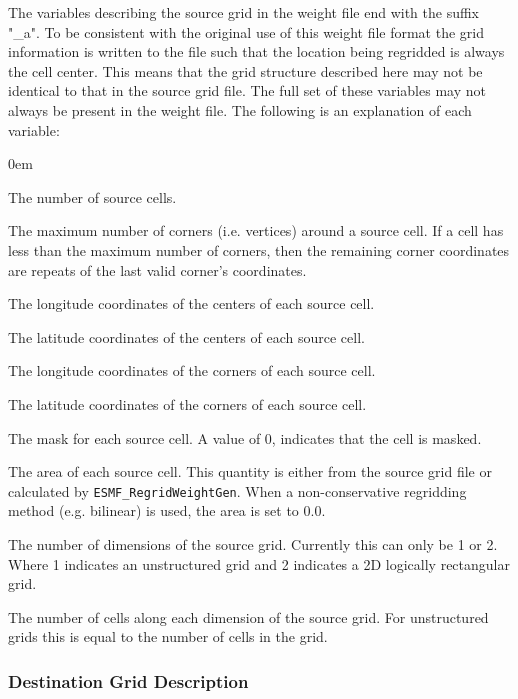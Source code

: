 The variables describing the source grid in the weight file end with the suffix "\_a". To be consistent with the original use of this weight file format 
the grid information is written to the file such that the location being regridded is always the cell center. This means that the grid structure described here may not be identical to that in the source grid file. The full set of these variables may not always be present in the weight file. The following is an 
explanation of each variable:
\begin{description}
  \itemsep0em
  \item[n\_a] The number of source cells. 
  \item[nv\_a] The maximum number of corners (i.e. vertices)  around a source cell. If a cell has less than the maximum number of corners, then the remaining corner coordinates are repeats of the last valid corner's coordinates.    
  \item[xc\_a] The longitude coordinates of the centers of each source cell.  
  \item[yc\_a] The latitude coordinates of the centers of each source cell.  
  \item[xv\_a] The longitude coordinates of the corners of each source cell.  
  \item[yv\_a] The latitude coordinates of the corners of each source cell.  
  \item[mask\_a] The mask for each source cell. A value of 0, indicates that the cell is masked. 
  \item[area\_a] The area of each source cell. This quantity is either from the source grid file or calculated by {\tt ESMF\_RegridWeightGen}. When a non-conservative regridding method (e.g. bilinear) is used, the area is set to 0.0. 
  \item[src\_grid\_rank] The number of dimensions of the source grid. Currently this can only be 1 or 2. Where 1 indicates an unstructured grid and 2 indicates a 2D logically rectangular grid.
  \item[src\_grid\_dims] The number of cells along each dimension of the source grid. For unstructured grids this is equal to the number of cells in the grid. 
\end{description}

\subsubsection{Destination Grid Description}

